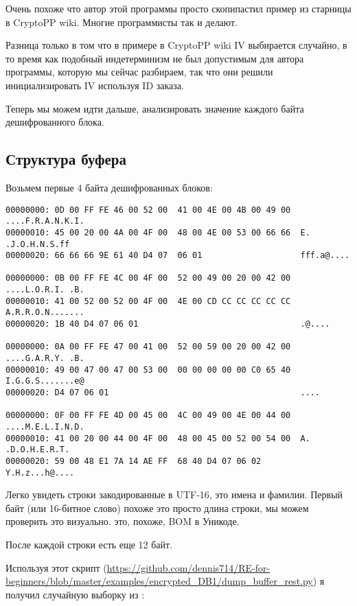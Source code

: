 Очень похоже что автор этой программы просто скопипастил пример из старницы в CryptoPP wiki.
Многие программисты так и делают.

Разница только в том что в примере в CryptoPP wiki \ac{IV} выбирается случайно, в то время как подобный индетерминизм
не был допустимым для автора программы, которую мы сейчас разбираем,
так что они решили инициализировать \ac{IV} используя ID заказа.

Теперь мы можем идти дальше, анализировать значение каждого байта дешифрованного блока.

\subsection{Структура буфера}

Возьмем первые 4 байта дешифрованных блоков:

\begin{lstlisting}
00000000: 0D 00 FF FE 46 00 52 00  41 00 4E 00 4B 00 49 00  ....F.R.A.N.K.I.
00000010: 45 00 20 00 4A 00 4F 00  48 00 4E 00 53 00 66 66  E. .J.O.H.N.S.ff
00000020: 66 66 66 9E 61 40 D4 07  06 01                    fff.a@....

00000000: 0B 00 FF FE 4C 00 4F 00  52 00 49 00 20 00 42 00  ....L.O.R.I. .B.
00000010: 41 00 52 00 52 00 4F 00  4E 00 CD CC CC CC CC CC  A.R.R.O.N.......
00000020: 1B 40 D4 07 06 01                                 .@....

00000000: 0A 00 FF FE 47 00 41 00  52 00 59 00 20 00 42 00  ....G.A.R.Y. .B.
00000010: 49 00 47 00 47 00 53 00  00 00 00 00 00 C0 65 40  I.G.G.S.......e@
00000020: D4 07 06 01                                       ....

00000000: 0F 00 FF FE 4D 00 45 00  4C 00 49 00 4E 00 44 00  ....M.E.L.I.N.D.
00000010: 41 00 20 00 44 00 4F 00  48 00 45 00 52 00 54 00  A. .D.O.H.E.R.T.
00000020: 59 00 48 E1 7A 14 AE FF  68 40 D4 07 06 02        Y.H.z...h@....
\end{lstlisting}

Легко увидеть строки закодированные в UTF-16, это имена и фамилии.
Первый байт (или 16-битное слово) похоже это просто длина строки, мы можем проверить это визуально.
 это, похоже, \ac{BOM} в Уникоде.

После каждой строки есть еще 12 байт.

Используя этот скрипт
(\url{https://github.com/dennis714/RE-for-beginners/blob/master/examples/encrypted_DB1/dump_buffer_rest.py})
я получил случайную выборку из :

